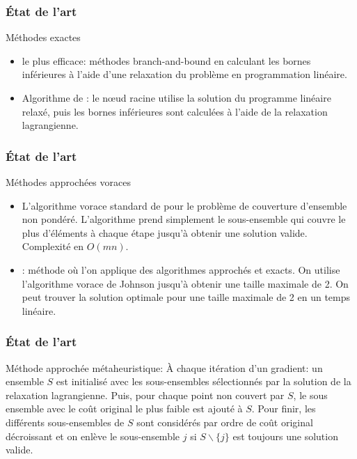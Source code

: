 \documentclass[aspectratio=169,11pt]{beamer}
\begin{document}
	\begin{frame}
		\frametitle{État de l'art}
		\begin{block}{Méthodes exactes}
			\begin{itemize}
				\item le plus efficace: méthodes branch-and-bound en calculant les bornes inférieures à l'aide d'une relaxation du problème en programmation linéaire.~\cite{caprara2000algorithms}
				\item Algorithme de \citeauthor{Beasley1987}: le nœud racine utilise la solution du programme linéaire relaxé, puis les bornes inférieures sont calculées à l'aide de la relaxation lagrangienne.~\cite{Beasley1987}
			\end{itemize}
		\end{block}
	\end{frame}
	\begin{frame}
		\frametitle{État de l'art}
		\begin{block}{Méthodes approchées voraces}
			\begin{itemize}
				\item L'algorithme vorace standard de \citeauthor{Johnson:1973:AAC:800125.804034} pour le problème de couverture d'ensemble non pondéré. L'algorithme prend simplement le sous-ensemble qui couvre le plus d'éléments à chaque étape jusqu'à obtenir une solution valide. Complexité en \(O(mn)\).~\cite{Johnson:1973:AAC:800125.804034}
				\item \citeauthor{Goldschmidt:1993:MGH:177276.177287}: méthode où l'on applique des
					algorithmes approchés et exacts.
					On utilise l'algorithme vorace de Johnson jusqu'à obtenir une taille maximale de 2.
					On peut trouver la solution optimale pour une taille maximale de 2 en un temps linéaire.~\cite{Goldschmidt:1993:MGH:177276.177287}
			\end{itemize}
		\end{block}
	\end{frame}

	\begin{frame}
		\frametitle{État de l'art}
		\begin{block}{Méthode approchée métaheuristique: \citeauthor{Beasley1990}}
			À chaque itération d'un gradient: un ensemble \(S\) est initialisé avec les sous-ensembles sélectionnés par la solution de la relaxation lagrangienne. Puis, pour chaque point non couvert par \(S\), le sous ensemble avec le coût original le plus faible est ajouté à \(S\). Pour finir, les différents sous-ensembles de \(S\) sont considérés par ordre de coût original décroissant et on enlève le sous-ensemble \(j\) si \(S \backslash \{j\}\) est toujours une solution valide.~\cite{Beasley1990}
		\end{block}
	\end{frame}
\end{document}
